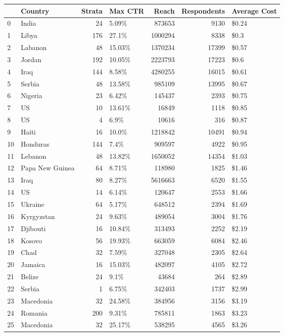 \documentclass[a4paper,12pt]{article}
\theoremstyle{proposition}
\begin{document}
\begin{tabular}{llrlrrl}
\toprule
 & Country & Strata & Max CTR & Reach & Respondents & Average Cost \\
\midrule
0 & India & 24 & 5.09\% & 873653 & 9130 & \$0.24 \\
1 & Libya & 176 & 27.1\% & 1000294 & 8338 & \$0.3 \\
2 & Labanon & 48 & 15.03\% & 1370234 & 17399 & \$0.57 \\
3 & Jordan & 192 & 10.05\% & 2223793 & 17223 & \$0.6 \\
4 & Iraq & 144 & 8.58\% & 4280255 & 16015 & \$0.61 \\
5 & Serbia & 48 & 13.58\% & 985109 & 13995 & \$0.67 \\
6 & Nigeria & 23 & 6.42\% & 145437 & 2393 & \$0.75 \\
7 & US & 10 & 13.61\% & 16849 & 1118 & \$0.85 \\
8 & US & 4 & 6.9\% & 10616 & 316 & \$0.87 \\
9 & Haiti & 16 & 10.0\% & 1218842 & 10491 & \$0.94 \\
10 & Honduras & 144 & 7.4\% & 909597 & 4922 & \$0.95 \\
11 & Lebanon & 48 & 13.82\% & 1650052 & 14354 & \$1.03 \\
12 & Papa New Guinea & 64 & 8.71\% & 118980 & 1825 & \$1.46 \\
13 & Iraq & 80 & 8.27\% & 5616663 & 6520 & \$1.55 \\
14 & US & 14 & 6.14\% & 120647 & 2553 & \$1.66 \\
15 & Ukraine & 64 & 5.17\% & 648512 & 2394 & \$1.69 \\
16 & Kyrgyzstan & 24 & 9.63\% & 489054 & 3004 & \$1.76 \\
17 & Djibouti & 16 & 10.84\% & 313493 & 2252 & \$2.19 \\
18 & Kosovo & 56 & 19.93\% & 663059 & 6084 & \$2.46 \\
19 & Chad & 32 & 7.59\% & 327048 & 2305 & \$2.64 \\
20 & Jamaica & 16 & 15.03\% & 482097 & 4105 & \$2.72 \\
21 & Belize & 24 & 9.1\% & 43684 & 264 & \$2.89 \\
22 & Serbia & 1 & 6.75\% & 342403 & 1737 & \$2.99 \\
23 & Macedonia & 32 & 24.58\% & 384956 & 3156 & \$3.19 \\
24 & Romania & 200 & 9.31\% & 785811 & 1863 & \$3.23 \\
25 & Macedonia & 32 & 25.17\% & 538295 & 4565 & \$3.26 \\

\end{tabular}
\end{document}
